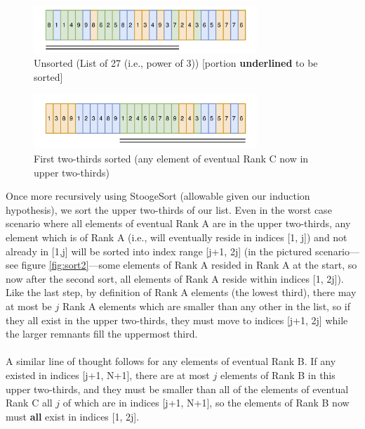 \documentclass[conference]{styles/acmsiggraph}
\newcommand{\?}{\stackrel{?}{=}}
\begin{document}
\begin{figure}[h]
    \centering
    \includegraphics[width=0.75\textwidth]{StoogeFigures/Unsorted.png}
    \caption{Unsorted (List of 27 (i.e., power of 3)) [portion \textbf{underlined} to be sorted]}
    \label{fig:unsorted}
\end{figure}
\FloatBarrier

\begin{figure}[h]
    \centering
    \includegraphics[width=0.75\textwidth]{StoogeFigures/Sort1.png}
    \caption{First two-thirds sorted (any element of eventual Rank C now in upper two-thirds)}
    \label{fig:sort1}
\end{figure}
\FloatBarrier

Once more recursively using StoogeSort (allowable given our induction hypothesis), we sort the upper two-thirds of our list.  Even in the worst case scenario where all elements of eventual Rank A are in the upper two-thirds, any element which is of Rank A (i.e., will eventually reside in indices [1, j]) and not already in [1,j] will be sorted into index range [j+1, 2j] (in the pictured scenario---see figure \ref{fig:sort2}---some elements of Rank A resided in Rank A at the start, so now after the second sort, all elements of Rank A reside within indices [1, 2j]).  Like the last step, by definition of Rank A elements (the lowest third), there may at most be $j$ Rank A elements which are smaller than any other in the list, so if they all exist in the upper two-thirds, they must move to indices [j+1, 2j] while the larger remnants fill the uppermost third. \\
\\
A similar line of thought follows for any elements of eventual Rank B.  If any existed in indices [j+1, N+1], there are at most $j$ elements of Rank B in this upper two-thirds, and they must be smaller than all of the elements of eventual Rank C all $j$ of which are in indices [j+1, N+1], so the elements of Rank B now must \textbf{all} exist in indices [1, 2j]. \\
\end{document}
